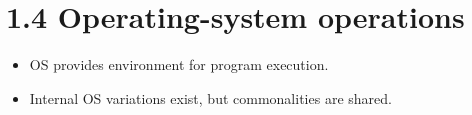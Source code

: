 \documentclass{article}
\begin{document}

\newpage
\section*{1.4 Operating-system operations}
\begin{itemize}
    \item OS provides environment for program execution.
    \item Internal OS variations exist, but commonalities are shared.
\end{itemize}
\end{document}
